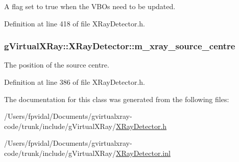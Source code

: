 A flag set to true when the VBOs need to be updated. 



Definition at line 418 of file XRayDetector.h.

\hypertarget{classg_virtual_x_ray_1_1_x_ray_detector_abc32b66cca7b4e14d3ddce4fcd31c497}{
\subsubsection[{m\_\-xray\_\-source\_\-centre}]{ {\bf gVirtualXRay::XRayDetector::m\_\-xray\_\-source\_\-centre}}}
\label{classg_virtual_x_ray_1_1_x_ray_detector_abc32b66cca7b4e14d3ddce4fcd31c497}


The position of the source centre. 



Definition at line 386 of file XRayDetector.h.



The documentation for this class was generated from the following files:\begin{DoxyCompactItemize}
\item 
/Users/fpvidal/Documents/gvirtualxray-\/code/trunk/include/gVirtualXRay/\hyperlink{_x_ray_detector_8h}{XRayDetector.h}\item 
/Users/fpvidal/Documents/gvirtualxray-\/code/trunk/include/gVirtualXRay/\hyperlink{_x_ray_detector_8inl}{XRayDetector.inl}\end{DoxyCompactItemize}
